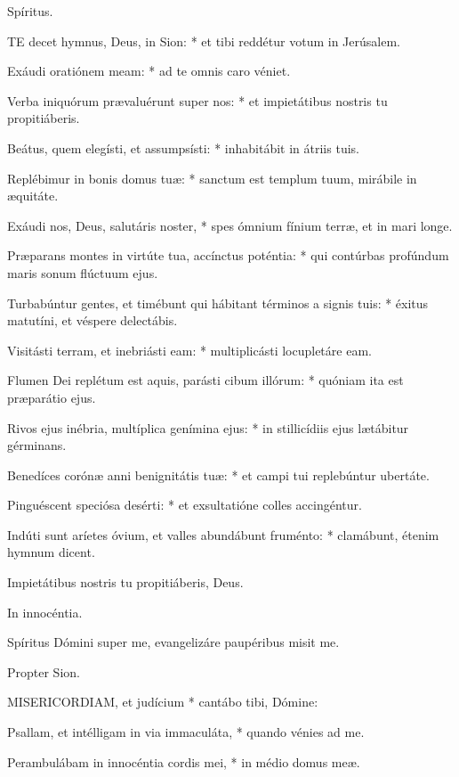  Spíritus.


\lettrine[lines=2]{T}{E} decet hymnus, Deus, in Sion: * et tibi reddétur votum in Jerúsalem.

Exáudi oratiónem meam: * ad te omnis caro véniet.

Verba iniquórum prævaluérunt super nos: * et impietátibus nostris tu propitiáberis.

Beátus, quem elegísti, et assumpsísti: * inhabitábit in átriis tuis.

Replébimur in bonis domus tuæ: * sanctum est templum tuum, mirábile in æquitáte.

Exáudi nos, Deus, salutáris noster, * spes ómnium fínium terræ, et in mari longe.

Præparans montes in virtúte tua, accínctus poténtia: * qui contúrbas profúndum maris sonum flúctuum ejus.

Turbabúntur gentes, et timébunt qui hábitant términos a signis tuis: * éxitus matutíni, et véspere delectábis.

Visitásti terram, et inebriásti eam: * multiplicásti locupletáre eam.

Flumen Dei replétum est aquis, parásti cibum illórum: * quóniam ita est præparátio ejus.

Rivos ejus inébria, multíplica genímina ejus: * in stillicídiis ejus lætábitur gérminans.

Benedíces corónæ anni benignitátis tuæ: * et campi tui replebúntur ubertáte.

Pinguéscent speciósa desérti: * et exsultatióne colles accingéntur.

Indúti sunt aríetes óvium, et valles abundábunt fruménto: * clamábunt, étenim hymnum dicent.

 Impietátibus nostris tu propitiáberis, Deus.

 In innocéntia.

  Spíritus Dómini super me, evangelizáre paupéribus misit me.

 Propter Sion.


\lettrine[lines=2]{M}{ISERICORDIAM}, et judícium * cantábo tibi, Dómine:

Psallam, et intélligam in via immaculáta, * quando vénies ad me.

Perambulábam in innocéntia cordis mei, * in médio domus meæ.

